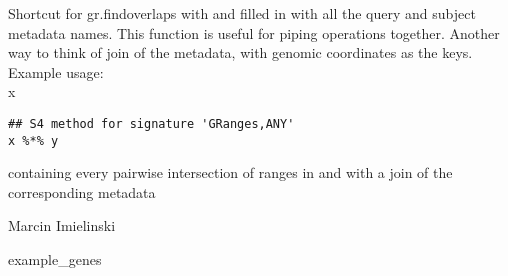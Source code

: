 \documentclass[a4paper]{book}
\begin{document}
%
\begin{Description}\relax
Shortcut for gr.findoverlaps with  and  filled in with all the query and subject metadata names.
This function is useful for piping  operations together. Another way to think of 
join of the metadata, with genomic coordinates as the keys. \\{}
Example usage: \\{}
x 
\end{Description}
%
\begin{Usage}
\begin{verbatim}
## S4 method for signature 'GRanges,ANY'
x %*% y
\end{verbatim}
\end{Usage}
%
\begin{Arguments}
\begin{ldescription}
\item[\code{x}] 

\item[\code{y}] 
\end{ldescription}
\end{Arguments}
%
\begin{Value}
 containing every pairwise intersection of ranges in  and  with a join of the corresponding  metadata
\end{Value}
%
\begin{Author}\relax
Marcin Imielinski
\end{Author}
%
\begin{Examples}
\begin{ExampleCode}
example_genes %
\end{ExampleCode}
\end{Examples}
\printindex{}
\end{document}
